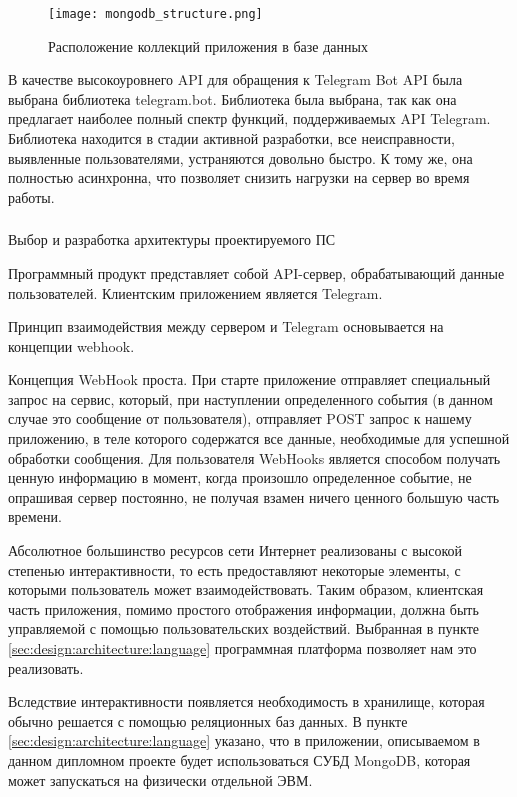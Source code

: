 \begin{figure}[!h]
	\centering
	\texttt{[image: mongodb\_structure.png]} 
	\caption{Расположение коллекций приложения в базе данных}
	\label{fig:analysis:structure:mongo}
\end{figure}

В качестве высокоуровнего API для обращения к Telegram Bot API была выбрана библиотека telegram.bot. Библиотека была выбрана, так как она предлагает наиболее полный спектр функций, поддерживаемых API Telegram. Библиотека находится в стадии активной разработки, все неисправности, выявленные пользователями, устраняются довольно быстро. К тому же, она полностью асинхронна, что позволяет снизить нагрузки на сервер во время работы.

\subsubsection{} Выбор и разработка архитектуры проектируемого ПС
\label{sec:design:architecture:architecture}

Программный продукт представляет собой API-сервер, обрабатывающий
данные пользователей. Клиентским приложением является Telegram.

Принцип взаимодействия между сервером и Telegram основывается на концепции webhook.

Концепция WebHook проста. При старте приложение отправляет специальный запрос на сервис, который, при наступлении определенного события (в данном случае это сообщение от пользователя), отправляет POST запрос к нашему приложению, в теле которого содержатся все данные, необходимые для успешной обработки сообщения. Для пользователя \linebreak WebHooks является способом получать ценную информацию в момент, когда произошло определенное событие, не опрашивая сервер постоянно, не получая взамен ничего ценного большую часть времени. 

Абсолютное большинство ресурсов сети Интернет реализованы с высокой степенью интерактивности, то есть предоставляют некоторые элементы, с которыми пользователь может взаимодействовать. Таким образом, клиентская часть приложения, помимо простого отображения информации, должна быть управляемой с помощью пользовательских воздействий. Выбранная в пункте \ref{sec:design:architecture:language} программная платформа позволяет нам это реализовать.

Вследствие интерактивности появляется необходимость в хранилище, которая обычно решается с помощью реляционных баз данных. В пункте \ref{sec:design:architecture:language} указано, что в приложении, описываемом в данном дипломном проекте будет использоваться СУБД MongoDB, которая может запускаться на физически отдельной ЭВМ.

